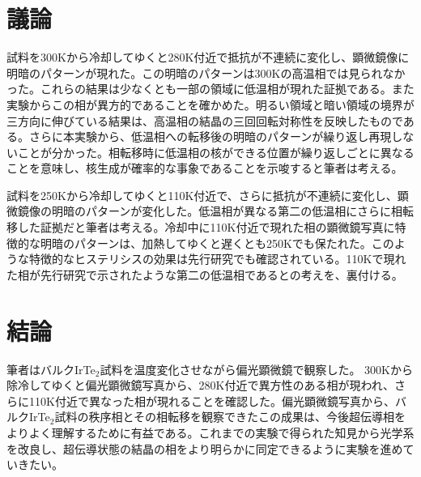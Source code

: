 \documentclass[11pt,a4paper]{jsarticle}
\begin{document}
\section{議論}
試料を300Kから冷却してゆくと280K付近で抵抗が不連続に変化し、顕微鏡像に明暗のパターンが現れた。この明暗のパターンは300Kの高温相では見られなかった。これらの結果は少なくとも一部の領域に低温相が現れた証拠である。また実験からこの相が異方的であることを確かめた。明るい領域と暗い領域の境界が三方向に伸びている結果は、高温相の結晶の三回回転対称性を反映したものである。さらに本実験から、低温相への転移後の明暗のパターンが繰り返し再現しないことが分かった。相転移時に低温相の核ができる位置が繰り返しごとに異なることを意味し、核生成が確率的な事象であることを示唆すると筆者は考える。

試料を250Kから冷却してゆくと110K付近で、さらに抵抗が不連続に変化し、顕微鏡像の明暗のパターンが変化した。低温相が異なる第二の低温相にさらに相転移した証拠だと筆者は考える。冷却中に110K付近で現れた相の顕微鏡写真に特徴的な明暗のパターンは、加熱してゆくと遅くとも250Kでも保たれた。このような特徴的なヒステリシスの効果は先行研究\cite{IrTe_TT3,IrTe_TT4}でも確認されている。110Kで現れた相が先行研究で示されたような第二の低温相であるとの考えを、裏付ける。
 
 \section{結論}
筆者はバルクIrTe$_2$試料を温度変化させながら偏光顕微鏡で観察した。
300Kから除冷してゆくと偏光顕微鏡写真から、280K付近で異方性のある相が現われ、さらに110K付近で異なった相が現れることを確認した。偏光顕微鏡写真から、バルクIrTe$_2$試料の秩序相とその相転移を観察できたこの成果は、今後超伝導相をよりよく理解するために有益である。これまでの実験で得られた知見から光学系を改良し、超伝導状態の結晶の相をより明らかに同定できるように実験を進めていきたい。



\end{document}
